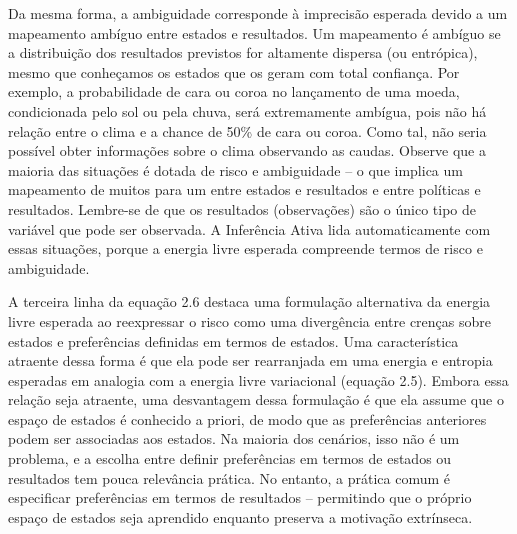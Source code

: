 \documentclass[
  12pt,
]{book}
\begin{document}
Da mesma forma, a ambiguidade corresponde à imprecisão esperada devido a um mapeamento ambíguo entre estados e resultados. Um mapeamento é ambíguo se a distribuição dos resultados previstos for altamente dispersa (ou entrópica), mesmo que conheçamos os estados que os geram com total confiança. Por exemplo, a probabilidade de cara ou coroa no lançamento de uma moeda, condicionada pelo sol ou pela chuva, será extremamente ambígua, pois não há relação entre o clima e a chance de 50\% de cara ou coroa. Como tal, não seria possível obter informações sobre o clima observando as caudas. Observe que a maioria das situações é dotada de risco e ambiguidade -- o que implica um mapeamento de muitos para um entre estados e resultados e entre políticas e resultados. Lembre-se de que os resultados (observações) são o único tipo de variável que pode ser observada. A Inferência Ativa lida automaticamente com essas situações, porque a energia livre esperada compreende termos de risco e ambiguidade.

A terceira linha da equação 2.6 destaca uma formulação alternativa da energia livre esperada ao reexpressar o risco como uma divergência entre crenças sobre estados e preferências definidas em termos de estados. Uma característica atraente dessa forma é que ela pode ser rearranjada em uma energia e entropia esperadas em analogia com a energia livre variacional (equação 2.5). Embora essa relação seja atraente, uma desvantagem dessa formulação é que ela assume que o espaço de estados é conhecido a priori, de modo que as preferências anteriores podem ser associadas aos estados. Na maioria dos cenários, isso não é um problema, e a escolha entre definir preferências em termos de estados ou resultados tem pouca relevância prática. No entanto, a prática comum é especificar preferências em termos de resultados -- permitindo que o próprio espaço de estados seja aprendido enquanto preserva a motivação extrínseca.
\end{document}
